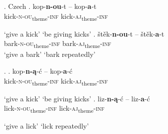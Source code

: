 \ex. Czech \label{ch3:Cz}
\ag. 
kop-\textbf{n-ou}-t -- kop-\textbf{a}-t\\
kick-\textsc{n-ou}\textsubscript{theme}-\textsc{inf} {} kick-\textsc{aj}\textsubscript{theme}-\textsc{inf}\\
\strut `give a kick' \hskip 1.4cm `be giving kicks'\label{ch3:kop}
\bg.
\v{s}t\v{e}k-\textbf{n-ou}-t -- \v{s}t\v{e}k-\textbf{a}-t\\
bark-\textsc{n-ou}\textsubscript{theme}-\textsc{inf} {} bark-\textsc{aj}\textsubscript{theme}-\textsc{inf}\\
`give a bark' \hskip 1.4cm `bark repeatedly'

\ex. \label{ch3:P}
\ag. 
kop-\textbf{n-\k{a}}-\'c -- kop-\textbf{a}-\'c\\
kick-\textsc{n-ou}\textsubscript{theme}-\textsc{inf} {} kick-\textsc{aj}\textsubscript{theme}-\textsc{inf}\\
\strut `give a kick' \hskip 1.4cm `be giving kicks'
\bg. 
liz-\textbf{n-\k{a}}-\'c -- liz-\textbf{a}-\'c\\
lick-\textsc{n-ou}\textsubscript{theme}-\textsc{inf} {} lick-\textsc{aj}\textsubscript{theme}-\textsc{inf}\\
\strut `give a lick' \hskip 1.4cm `lick repeatedly'

